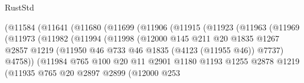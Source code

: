 \begin{lexlean}{RustStd}
\begin{coremodule}
                          (@11584
                            (@11641
                              (@11680
                                (@11699
                                  (@11906
                                    (@11915
                                      (@11923
                                        (@11963
                                          (@11969
                                            (@11973
                                              (@11982
                                                (@11994
                                                  (@11998
                                                    (@12000
                                                      @145
                                                      @211
                                                      @20
                                                      @1835
                                                      @1267
                                                      @2857
                                                      @1219
                                                      (@11950
                                                        @46
                                                        @733
                                                        @46
                                                        @1835
                                                        (@4123 (@11955 @46))
                                                        @7737)
                                                      @4758))
                                                  (@11984
                                                    @765
                                                    @100
                                                    @20
                                                    @11
                                                    @2901
                                                    @1180
                                                    @1193
                                                    @1255
                                                    @2878
                                                    @1219
                                                    (@11935
                                                      @765
                                                      @20
                                                      @2897
                                                      @2899
                                                      (@12000
                                                        @253

\end{coremodule}
\end{lexlean}
